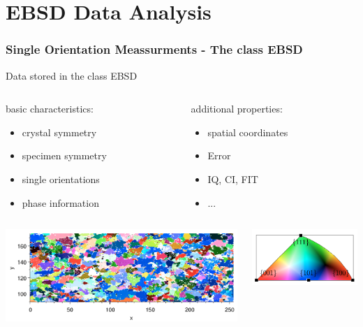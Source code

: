 \section{EBSD Data Analysis}

\begin{frame}[fragile]
  \frametitle{Single Orientation Meassurments - The class EBSD}

  Data stored in the class \alert{EBSD}

  \medskip

  \begin{columns}


    \begin{column}{6cm}

      basic characteristics:
      \begin{itemize}
      \item crystal symmetry
      \item specimen symmetry
      \item single orientations
      \item phase information
      \end{itemize}

    \end{column}

    \begin{column}{5.5cm}

      additional properties:
      \begin{itemize}
      \item spatial coordinates
      \item Error
      \item IQ, CI, FIT
      \item ...
      \end{itemize}
    \end{column}
  \end{columns}

  \bigskip

  \begin{columns}
    \begin{column}{8cm}
      \includegraphics[height=3.5cm]{pic/ebsd.pdf}
    \end{column}
    \begin{column}{4cm}
      \includegraphics[width=4cm]{pic/ebsdtriangle.pdf}
    \end{column}
  \end{columns}
\end{frame}

